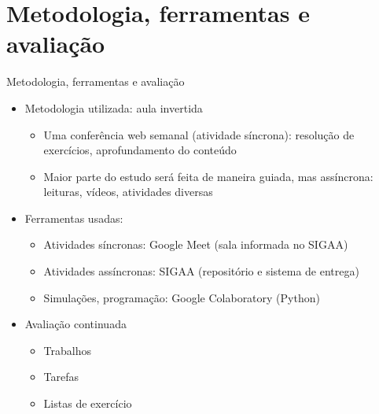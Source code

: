     \section[ slide = true]{Metodologia, ferramentas e avaliação}
      \begin{slide}[toc=]{Metodologia, ferramentas e avaliação}
         \begin{itemize}
	    \item Metodologia utilizada: aula invertida  
		    \begin{itemize}
			    \item Uma conferência web semanal (atividade síncrona): resolução de exercícios, aprofundamento do conteúdo
			    \item Maior parte do estudo será feita de maneira guiada, mas assíncrona: leituras, vídeos, atividades diversas
		    \end{itemize}
	    \item Ferramentas usadas:
		    \begin{itemize}
			    \item Atividades síncronas: Google Meet (sala informada no SIGAA)%
			    \item Atividades assíncronas: SIGAA (repositório e sistema de entrega)
			    \item Simulações, programação: Google Colaboratory (Python)
		    \end{itemize}

            \item Avaliação continuada
            \begin{itemize}
               \item Trabalhos 
               \item Tarefas 
	       \item Listas de exercício
	    \end{itemize}
	 \end{itemize}
      \end{slide}
      
